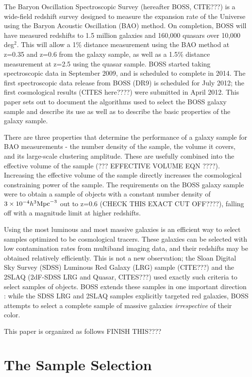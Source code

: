 \documentclass[iop,apj]{emulateapj}
\begin{document}
The Baryon Oscillation Spectroscopic Survey (hereafter BOSS, CITE???) is a
wide-field redshift survey designed to measure the expansion rate of the
Universe using the Baryon Acoustic Oscillation (BAO) method. On completion, BOSS
will have measured redshifts to 1.5 million galaxies and 160,000 quasars over
10,000 deg$^2$. This will allow a 1\% distance measurement using the BAO method
at z=0.35 and z=0.6 from the galaxy sample, as well as a 1.5\% distance
measurement at z=2.5 using the quasar sample. BOSS started taking spectroscopic 
data in September 2009, and is scheduled to complete in 2014. The first
spectroscopic data release from BOSS (DR9) is scheduled for July 2012; the first
cosmological results (CITES here????) were submitted in April 2012.
This paper sets out to document the algorithms used to select the BOSS galaxy
sample and describe its use as well as to describe the basic properties of the
galaxy sample.

There are three properties that determine the performance of a galaxy sample for
BAO measurements - the number density of the sample, the volume it covers, and
its large-scale clustering amplitude. These are usefully combined into the
effective volume of the sample (??? EFFECTIVE VOLUME EQN ????). Increasing the
effective volume of the sample directly increases the cosmological constraining
power of the sample. The requirements on the BOSS galaxy sample were to obtain
a sample of objects with a constant number density of $3 \times 10^{-4} h^{3}
\rm{Mpc}^{-3}$ out to z=0.6 (CHECK THIS EXACT CUT OFF????), falling off with a
magnitude limit at higher redshifts. 

Using the most luminous and most massive galaxies is an
efficient way to select samples optimized to be cosmological tracers. These
galaxies can be selected with low contamination rates from multiband imaging
data, and their redshifts may be obtained relatively efficiently. This is 
not a new observation; the Sloan Digital Sky Survey (SDSS) Luminous Red Galaxy
(LRG) sample (CITE???) and the 2SLAQ (2dF-SDSS LRG and Quasar, CITES???) used 
exactly such criteria to select samples of objects. BOSS extends these samples
in one important direction : while the SDSS LRG and 2SLAQ samples explicitly
targeted red galaxies, BOSS attempts to select a complete sample of massive
galaxies {\it irrespective} of their color. 

This paper is organized as follows FINISH THIS????

\section{The Sample Selection}
\end{document}

